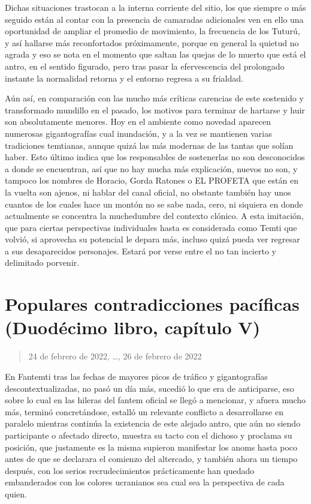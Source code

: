\documentclass[
]{book}
\begin{document}
Dichas situaciones trastocan a la interna corriente del sitio, los que siempre o más seguido están al contar con la presencia de camaradas adicionales ven en ello una oportunidad de ampliar el promedio de movimiento, la frecuencia de los Tuturú, y así hallarse más reconfortados próximamente, porque en general la quietud no agrada y eso se nota en el momento que saltan las quejas de lo muerto que está el antro, en el sentido figurado, pero tras pasar la efervescencia del prolongado instante la normalidad retorna y el entorno regresa a su frialdad.

Aún así, en comparación con las mucho más críticas carencias de este sostenido y transformado mundillo en el pasado, los motivos para terminar de hartarse y huir son absolutamente menores. Hoy en el ambiente como novedad aparecen numerosas gigantografías cual inundación, y a la vez se mantienen varias tradiciones temtianas, aunque quizá las más modernas de las tantas que solían haber. Esto último indica que los responsables de sostenerlas no son desconocidos a donde se encuentran, así que no hay mucha más explicación, nuevos no son, y tampoco los nombres de Horacio, Gorda Ratones o EL PROFETA que están en la vuelta son ajenos, ni hablar del canal oficial, no obstante también hay unos cuantos de los cuales hace un montón no se sabe nada, cero, ni siquiera en donde actualmente se concentra la muchedumbre del contexto clónico. A esta imitación, que para ciertas perspectivas individuales hasta es considerada como Temti que volvió, si aprovecha su potencial le depara más, incluso quizá pueda ver regresar a sus desaparecidos personajes. Estará por verse entre el no tan incierto y delimitado porvenir.

\hypertarget{populares-contradicciones-pacuxedficas-duoduxe9cimo-libro-capuxedtulo-v}{%
\section{Populares contradicciones pacíficas (Duodécimo libro, capítulo V)}\label{populares-contradicciones-pacuxedficas-duoduxe9cimo-libro-capuxedtulo-v}}

\begin{quote}
24 de febrero de 2022, \ldots, 26 de febrero de 2022
\end{quote}

En Fantemti tras las fechas de mayores picos de tráfico y gigantografías descontextualizadas, no pasó un día más, sucedió lo que era de anticiparse, eso sobre lo cual en las hileras del fantem oficial se llegó a mencionar, y afuera mucho más, terminó concretándose, estalló un relevante conflicto a desarrollarse en paralelo mientras continúa la existencia de este alejado antro, que aún no siendo participante o afectado directo, muestra su tacto con el dichoso y proclama su posición, que justamente es la misma supieron manifestar los anoms hasta poco antes de que se declarara el comienzo del altercado, y también ahora un tiempo después, con los serios recrudecimientos prácticamente han quedado embanderados con los colores ucranianos sea cual sea la perspectiva de cada quien.
\end{document}
